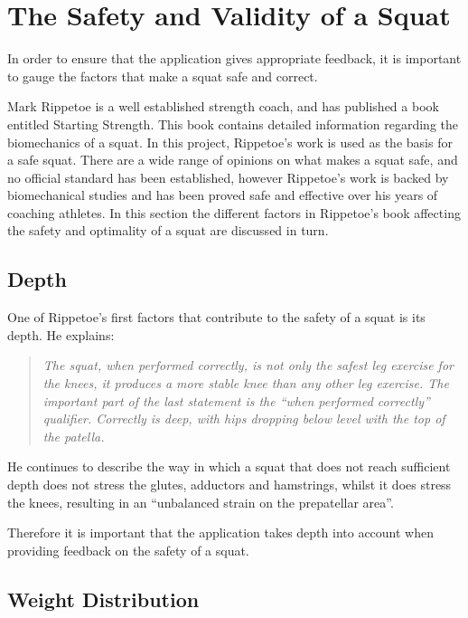 \section{The Safety and Validity of a Squat}

In order to ensure that the application gives appropriate feedback, it is important to gauge the factors that make a squat safe and correct.

Mark Rippetoe is a well established strength coach, and has published a book entitled Starting Strength\cite{startingstrength}. This book contains detailed information regarding the biomechanics of a squat. In this project, Rippetoe's work is used as the basis for a safe squat. There are a wide range of opinions on what makes a squat safe, and no official standard has been established, however Rippetoe's work is backed by biomechanical studies and has been proved safe and effective over his years of coaching athletes. In this section the different factors in Rippetoe's book affecting the safety and optimality of a squat are discussed in turn.

\subsection{Depth}

One of Rippetoe's first factors that contribute to the safety of a squat is its depth. He explains:

\begin{quote}
\emph{The squat, when performed correctly, is not only the safest leg exercise for the knees, it produces a more stable knee than any other leg exercise. The important part of the last statement is the ``when performed correctly'' qualifier. Correctly is deep, with hips dropping below level with the 
top of the patella.}
\end{quote}

He continues to describe the way in which a squat that does not reach sufficient depth does not stress the glutes, adductors and hamstrings, whilst it does stress the knees, resulting in an ``unbalanced strain on the prepatellar area''.

Therefore it is important that the application takes depth into account when providing feedback on the safety of a squat.

\subsection{Weight Distribution}

